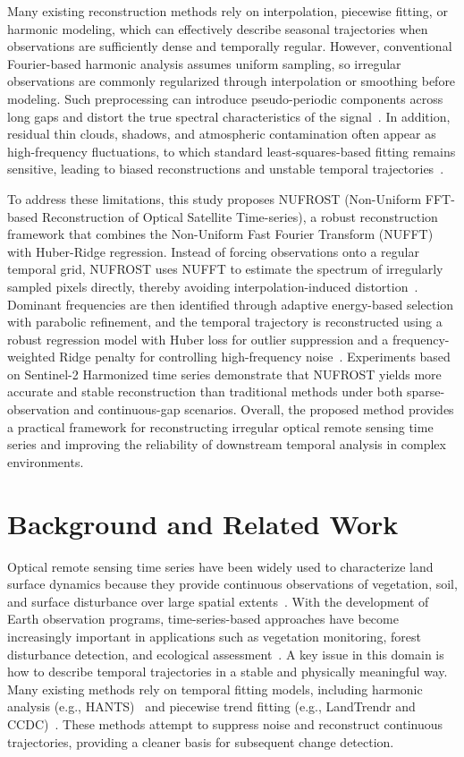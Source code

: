 \documentclass[letterpaper,journal]{IEEEtran}
\begin{document}
Many existing reconstruction methods rely on interpolation, piecewise fitting, or harmonic modeling, which can effectively describe seasonal trajectories when observations are sufficiently dense and temporally regular. However, conventional Fourier-based harmonic analysis assumes uniform sampling, so irregular observations are commonly regularized through interpolation or smoothing before modeling. Such preprocessing can introduce pseudo-periodic components across long gaps and distort the true spectral characteristics of the signal~\cite{ref4,ref5}. In addition, residual thin clouds, shadows, and atmospheric contamination often appear as high-frequency fluctuations, to which standard least-squares-based fitting remains sensitive, leading to biased reconstructions and unstable temporal trajectories~\cite{ref6,ref7}.

To address these limitations, this study proposes NUFROST (Non-Uniform FFT-based Reconstruction of Optical Satellite Time-series), a robust reconstruction framework that combines the Non-Uniform Fast Fourier Transform (NUFFT) with Huber-Ridge regression. Instead of forcing observations onto a regular temporal grid, NUFROST uses NUFFT to estimate the spectrum of irregularly sampled pixels directly, thereby avoiding interpolation-induced distortion~\cite{ref4,ref6}. Dominant frequencies are then identified through adaptive energy-based selection with parabolic refinement, and the temporal trajectory is reconstructed using a robust regression model with Huber loss for outlier suppression and a frequency-weighted Ridge penalty for controlling high-frequency noise~\cite{ref8,ref9}. Experiments based on Sentinel-2 Harmonized time series demonstrate that NUFROST yields more accurate and stable reconstruction than traditional methods under both sparse-observation and continuous-gap scenarios. Overall, the proposed method provides a practical framework for reconstructing irregular optical remote sensing time series and improving the reliability of downstream temporal analysis in complex environments.

\section{Background and Related Work}
\IEEEpubidadjcol
Optical remote sensing time series have been widely used to characterize land surface dynamics because they provide continuous observations of vegetation, soil, and surface disturbance over large spatial extents~\cite{ref1}. With the development of Earth observation programs, time-series-based approaches have become increasingly important in applications such as vegetation monitoring, forest disturbance detection, and ecological assessment~\cite{ref2}. A key issue in this domain is how to describe temporal trajectories in a stable and physically meaningful way. Many existing methods rely on temporal fitting models, including harmonic analysis (e.g., HANTS)~\cite{ref10} and piecewise trend fitting (e.g., LandTrendr and CCDC)~\cite{ref11,ref12}. These methods attempt to suppress noise and reconstruct continuous trajectories, providing a cleaner basis for subsequent change detection.
\end{document}
